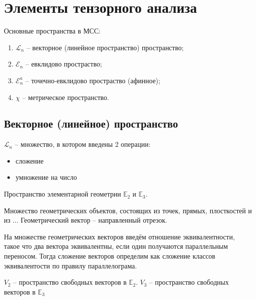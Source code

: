 \section{Элементы тензорного анализа}

Основные пространства в МСС:
\begin{enumerate}
  \item $\mathcal{L}_n$ -- векторное (линейное пространство) пространство;
  \item $\mathcal{E}_n$ -- евклидово простраство;
  \item $\mathcal{E}_n^a$ -- точечно-евклидово простраство (афинное);
  \item $\chi$ -- метрическое пространство.
\end{enumerate}

\subsection{Векторное (линейное) пространство}

\begin{definition}
  $\mathcal{L}_n$ -- множество, в котором введены 2 операции:
  \begin{itemize}
    \item сложение
    \item умножение на число
  \end{itemize}
\end{definition}

\begin{example}
  Пространство элементарной геометрии $\mathbb{E}_2$ и $\mathbb{E}_3$.

  Множество геометрических объектов, состоящих из точек, прямых, плосткостей и из ... Геометрический
  вектор -- направленный отрезок.

  На множестве геометрических векторов введём отношение эквивалентности, такое что два вектора
  эквивалентны, если один получаются параллельным переносом. Тогда сложение векторов определим
  как сложение классов эквивалентости по правилу параллелограма. 

  $V_2$ -- пространство свободных векторов в $\mathbb E_2$.
  $V_3$ -- пространство свободных векторов в $\mathbb E_3$
\end{example}

